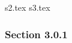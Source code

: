 \documentclass{article}
\begin{document}

{s2.tex}
{s3.tex}
\subsubsection{Section 3.0.1}
\end{document}
